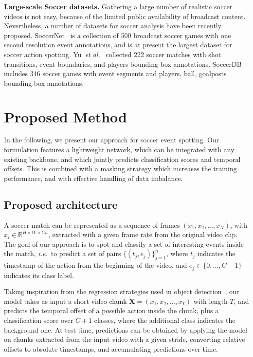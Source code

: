 \documentclass[a4paper,conference]{IEEEtran}
\newcommand{\tit}[1]{\smallbreak\noindent\textbf{#1.}}
\def \ie {\emph{i.e.}}
\def \etal {\emph{et al.}}
\begin{document}
\tit{Large-scale Soccer datasets}
Gathering a large number of realistic soccer videos is not easy, because of the limited public availability of broadcast content. Nevertheless, a number of datasets for soccer analysis have been recently proposed. SoccerNet~\cite{giancola2018soccernet} is a collection of 500 broadcast soccer games with one second resolution event annotations, and is at present the largest dataset for soccer action spotting. Yu~\etal~\cite{yu2018comprehensive} collected 222 soccer matches with shot transitions, event boundaries, and players bounding box annotations. SoccerDB~\cite{wang2019comprehensive} includes 346 soccer games with event segments and players, ball, goalposts bounding box annotations.

\section{Proposed Method}
In the following, we present our approach for soccer event spotting. Our formulation features a lightweight network, which can be integrated with any existing backbone, and which jointly predicts classification scores and temporal offsets. This is combined with a masking strategy which increases the training performance, and with effective handling of data imbalance.

\subsection{Proposed architecture}

A soccer match can be represented as a sequence of frames $\left( x_{1}, x_{2}, ..., x_{N} \right)$, with $x_{i} \in \mathbb{R}^{H \times W \times Ch}$, extracted with a given frame rate from the original video clip. The goal of our approach is to spot and classify a set of interesting events inside the match, \ie~to predict a set of pairs $\{(t_{j}, e_{j})\}_{j=1}^n$, where $t_j$ indicates the timestamp of the action from the beginning of the video, and $e_j \in \{0, ..., C-1\}$ indicates its class label.



Taking inspiration from the regression strategies used in object detection~\cite{ren2015faster}, our model takes as input a short video chunk $\bm{X} = \left(x_{1}, x_{2}, ..., x_{T} \right)$ with length $T$, and predicts the temporal offset of a possible action inside the chunk, plus a classification score over $C+1$ classes, where the additional class indicates the background one. At test time, predictions can be obtained by applying the model on chunks extracted from the input video with a given stride, converting relative offsets to absolute timestamps, and accumulating predictions over time.
\end{document}

